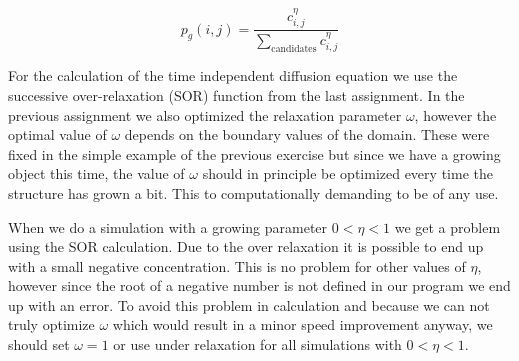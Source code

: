 \documentclass[a4paper]{article}
\begin{document}
\begin{equation}\label{eq:grow_prob}
    p_g (i,j) = \frac{c_{i,j}^{\eta}}{\sum_{\text{candidates}} c_{i,j}^{\eta}}
\end{equation}

For the calculation of the time independent diffusion equation we use the successive over-relaxation (SOR) function from the last assignment. In the previous assignment \cite{scico1} we also optimized the relaxation parameter $\omega$, however the optimal value of $\omega$ depends on the boundary values of the domain. These were fixed in the simple example of the previous exercise but since we have a growing object this time, the value of $\omega$ should in principle be optimized every time the structure has grown a bit. This to computationally demanding to be of any use. 

When we do a simulation with a growing parameter $0 < \eta < 1$ we get a problem using the SOR calculation. Due to the over relaxation it is possible to end up with a small negative concentration. This is no problem for other values of $\eta$, however since the root of a negative number is not defined in our program we end up with an error. To avoid this problem in calculation and because we can not truly optimize $\omega$ which would result in a minor speed improvement anyway, we should set $\omega = 1$ or use under relaxation for all simulations with $0 < \eta < 1$. 
\end{document}

